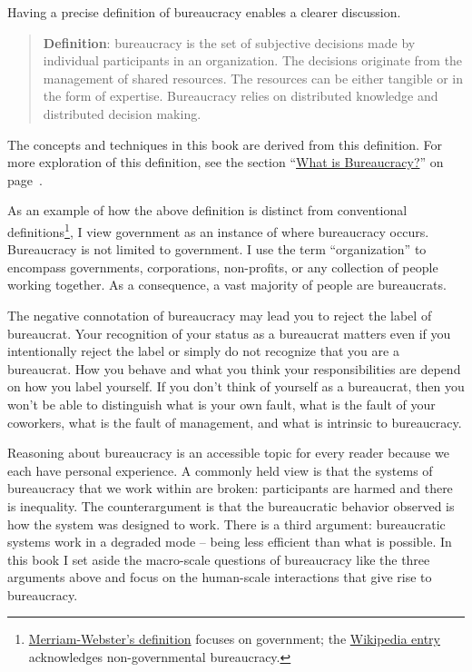 Having a precise definition of bureaucracy enables a clearer discussion. 
\begin{quote}
\textbf{Definition}: \Gls{bureaucracy} is the set of subjective decisions made by individual participants in an organization. The decisions originate from the management of shared resources. The resources can be either tangible or in the form of expertise. Bureaucracy relies on distributed knowledge and distributed decision making. 
\end{quote}

The concepts and techniques in this book are derived from this definition. For more exploration of this definition, see the section ``\hyperref[sec:define-bureaucracy]{What is Bureaucracy?}'' on page~\pageref{sec:define-bureaucracy}.

As an example of how the above definition is distinct from conventional definitions\footnote{\href{https://www.merriam-webster.com/dictionary/bureaucracy}{Merriam-Webster's definition} focuses on government; the \href{https://www.merriam-webster.com/dictionary/bureaucracy}{Wikipedia entry} acknowledges non-governmental bureaucracy.}, I view government as an instance of where bureaucracy occurs. Bureaucracy is not limited to government. I use the term ``organization'' to encompass governments, corporations, non-profits, or any collection of people working together. As a consequence, a vast majority of people are bureaucrats. 

The negative connotation of bureaucracy may lead you to reject the label of bureaucrat. Your recognition of your status as a bureaucrat matters even if you intentionally reject the label or simply do not recognize that you are a bureaucrat. How you behave and what you think your responsibilities are depend on how you label yourself.
If you don't think of yourself as a bureaucrat, then you won't be able to distinguish what is your own fault, what is the fault of your coworkers, what is the fault of management, and what is intrinsic to bureaucracy. 

Reasoning about bureaucracy is an accessible topic for every reader because we each have personal experience.
A commonly held view is that the systems of bureaucracy that we work within are broken: participants are harmed and there is inequality. 
The counterargument is that the bureaucratic behavior observed is how the system was designed to work. There is a third argument: bureaucratic systems work in a degraded mode -- being less efficient than what is possible. 
In this book I set aside the macro-scale questions of bureaucracy like the three arguments above and focus on the human-scale interactions that give rise to bureaucracy.

